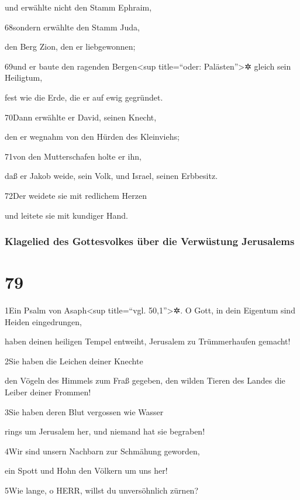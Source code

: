 und erwählte nicht den Stamm Ephraim,

68sondern erwählte den Stamm Juda,

den Berg Zion, den er liebgewonnen;

69und er baute den ragenden Bergen\textless sup title=``oder:
Palästen''\textgreater✲ gleich sein Heiligtum,

fest wie die Erde, die er auf ewig gegründet.

70Dann erwählte er David, seinen Knecht,

den er wegnahm von den Hürden des Kleinviehs;

71von den Mutterschafen holte er ihn,

daß er Jakob weide, sein Volk, und Israel, seinen Erbbesitz.

72Der weidete sie mit redlichem Herzen

und leitete sie mit kundiger Hand.

\hypertarget{klagelied-des-gottesvolkes-uxfcber-die-verwuxfcstung-jerusalems}{%
\subsubsection{Klagelied des Gottesvolkes über die Verwüstung
Jerusalems}\label{klagelied-des-gottesvolkes-uxfcber-die-verwuxfcstung-jerusalems}}

\hypertarget{section-78}{%
\section{79}\label{section-78}}

1Ein Psalm von Asaph\textless sup title=``vgl. 50,1''\textgreater✲. O
Gott, in dein Eigentum sind Heiden eingedrungen,

haben deinen heiligen Tempel entweiht, Jerusalem zu Trümmerhaufen
gemacht!

2Sie haben die Leichen deiner Knechte

den Vögeln des Himmels zum Fraß gegeben, den wilden Tieren des Landes
die Leiber deiner Frommen!

3Sie haben deren Blut vergossen wie Wasser

rings um Jerusalem her, und niemand hat sie begraben!

4Wir sind unsern Nachbarn zur Schmähung geworden,

ein Spott und Hohn den Völkern um uns her!

5Wie lange, o HERR, willst du unversöhnlich zürnen?

